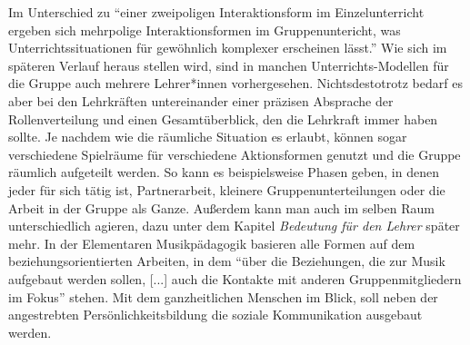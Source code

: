 Im Unterschied zu \enquote{einer zweipoligen Interaktionsform im
Einzelunterricht ergeben sich mehrpolige Interaktionsformen im Gruppenuntericht,
was Unterrichtssituationen für gewöhnlich komplexer erscheinen lässt.}
\autocite[30]{losert:die_kunst_zu_unterrichten} Wie sich im späteren Verlauf heraus stellen wird,
sind in manchen Unterrichts-Modellen für die Gruppe auch mehrere Lehrer*innen
vorhergesehen. Nichtsdestotrotz bedarf es aber bei den Lehrkräften untereinander
einer präzisen Absprache der Rollenverteilung und einen Gesamtüberblick, den die
Lehrkraft immer haben sollte. Je nachdem wie die räumliche Situation es erlaubt,
können sogar verschiedene Spielräume für verschiedene Aktionsformen genutzt und
die Gruppe räumlich aufgeteilt werden. So kann es beispielsweise Phasen geben,
in denen jeder für sich tätig ist, Partnerarbeit, kleinere Gruppenunterteilungen
oder die Arbeit in der Gruppe als Ganze. Außerdem kann man auch im selben
Raum unterschiedlich agieren, dazu unter dem Kapitel \emph{Bedeutung für den
Lehrer} später mehr. In der Elementaren Musikpädagogik basieren alle Formen auf
dem beziehungsorientierten Arbeiten, in dem \enquote{über die Beziehungen, die
zur Musik aufgebaut werden sollen, [...] auch die Kontakte mit anderen
Gruppenmitgliedern im Fokus} \autocite[10]{dartsch:kern_des_musizierens} stehen.
Mit dem ganzheitlichen Menschen im Blick, soll neben der angestrebten
Persönlichkeitsbildung die soziale Kommunikation ausgebaut werden.
